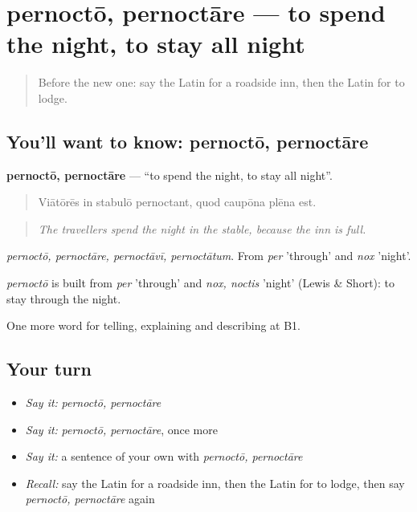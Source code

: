 \section[pernoctō, pernoctāre]{pernoctō, pernoctāre — to spend the night, to stay all night}

\label{lesson:LA-C445-pernocto}



\begin{quote}
Before the new one: say the Latin for a roadside inn, then the Latin for to lodge.
\end{quote}

\subsection*{You'll want to know: pernoctō, pernoctāre}
\textbf{pernoctō, pernoctāre} — \textquotedblleft{}to spend the night, to stay all night\textquotedblright{}.

\begin{quote}
Viātōrēs in stabulō pernoctant, quod caupōna plēna est.
\end{quote}

\begin{quote}
\emph{The travellers spend the night in the stable, because the inn is full.}
\end{quote}

\emph{pernoctō, pernoctāre, pernoctāvī, pernoctātum}. From \emph{per} 'through' and \emph{nox} 'night'.

\begin{cousinweb}
\emph{pernoctō} is built from \emph{per} 'through' and \emph{nox, noctis} 'night' (Lewis \& Short): to stay through the night.
\end{cousinweb}

\begin{grammarlens}[title={What you've built}]
One more word for telling, explaining and describing at B1.
\end{grammarlens}

\subsection*{Your turn}
\begin{itemize}
\raggedright
  \item \emph{Say it:} \emph{pernoctō, pernoctāre}
  \item \emph{Say it:} \emph{pernoctō, pernoctāre}, once more
  \item \emph{Say it:} a sentence of your own with \emph{pernoctō, pernoctāre}
  \item \emph{Recall:} say the Latin for a roadside inn, then the Latin for to lodge, then say \emph{pernoctō, pernoctāre} again
\end{itemize}

